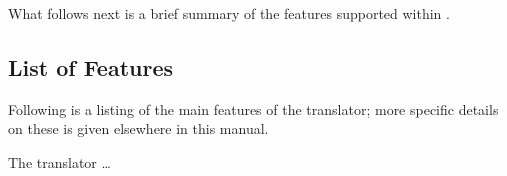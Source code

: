 \bigskip\noindent
What follows next is a brief summary of the features supported
within \latextohtml{}.\html{\dots}


\subsection{List of Features\label{features:ovw}}
%
Following is a listing of the main features of the translator;
more specific details on these is given elsewhere in this manual.

\smallskip\noindent
The \latextohtml{} translator \dots
%
